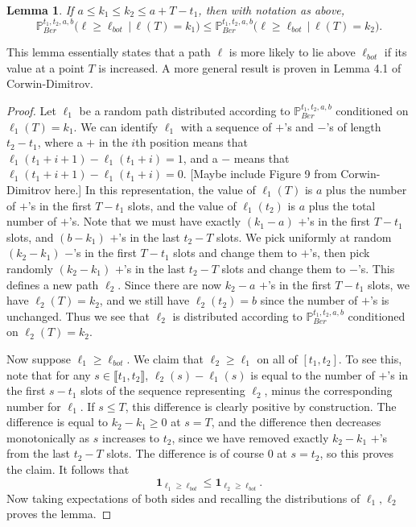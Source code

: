 \documentclass[12pt]{article}
\newtheorem{lemma}{Lemma}
\begin{document}
	\begin{lemma}\label{pathcounting}
		If $a\leq k_1\leq k_2\leq a + T - t_1$, then with notation as above,
		\[
		\mathbb{P}^{t_1, t_2, a, b}_{Ber}\big( \ell \geq \ell_{bot}\,\big|\,\ell(T) = k_1\big) \leq \mathbb{P}^{t_1, t_2, a, b}_{Ber}\big(\ell \geq \ell_{bot}\,\big|\,\ell(T) = k_2\big).
		\]
	\end{lemma}

	\begin{remark}
		This lemma essentially states that a path $\ell$ is more likely to lie above $\ell_{bot}$ if its value at a point $T$ is increased. A more general result is proven in Lemma 4.1 of Corwin-Dimitrov.
	\end{remark}

	\begin{proof}
		Let $\ell_1$ be a random path distributed according to $\mathbb{P}^{t_1, t_2, a, b}_{Ber}$ conditioned on $\ell_1(T) = k_1$. We can identify $\ell_1$ with a sequence of $+$'s and $-$'s of length $t_2-t_1$, where a $+$ in the $i$th position means that $\ell_1(t_1+i+1)-\ell_1(t_1+i) = 1$, and a $-$ means that $\ell_1(t_1+i+1)-\ell_1(t_1+i) = 0$. [Maybe include Figure 9 from Corwin-Dimitrov here.] In this representation, the value of $\ell_1(T)$ is $a$ plus the number of $+$'s in the first $T-t_1$ slots, and the value of $\ell_1(t_2)$ is $a$ plus the total number of $+$'s. Note that we must have exactly $(k_1-a)$ $+$'s in the first $T-t_1$ slots, and $(b-k_1)$ $+$'s in the last $t_2-T$ slots. We pick uniformly at random $(k_2-k_1)$ $-$'s in the first $T-t_1$ slots and change them to $+$'s, then pick randomly $(k_2-k_1)$ $+$'s in the last $t_2-T$ slots and change them to $-$'s. This defines a new path $\ell_2$. Since there are now $k_2-a$ $+$'s in the first $T-t_1$ slots, we have $\ell_2(T) = k_2$, and we still have $\ell_2(t_2) = b$ since the number of $+$'s is unchanged. Thus we see that $\ell_2$ is distributed according to $\mathbb{P}^{t_1,t_2,a,b}_{Ber}$ conditioned on $\ell_2(T) = k_2$. 
		
		Now suppose $\ell_1 \geq \ell_{bot}$. We claim that $\ell_2 \geq \ell_1$ on all of $[t_1,t_2]$. To see this, note that for any $s\in\llbracket t_1, t_2\rrbracket$, $\ell_2(s) - \ell_1(s)$ is equal to the number of $+$'s in the first $s-t_1$ slots of the sequence representing $\ell_2$, minus the corresponding number for $\ell_1$. If $s\leq T$, this difference is clearly positive by construction. The difference is equal to $k_2 - k_1 \geq 0$ at $s = T$, and the difference then decreases monotonically as $s$ increases to $t_2$, since we have removed exactly $k_2-k_1$ $+$'s from the last $t_2-T$ slots. The difference is of course 0 at $s = t_2$, so this proves the claim. It follows that
		\[
		\mathbf{1}_{\ell_1 \geq \ell_{bot}} \leq \mathbf{1}_{\ell_2 \geq \ell_{bot}}.
		\]
		Now taking expectations of both sides and recalling the distributions of $\ell_1,\ell_2$ proves the lemma.
	\end{proof}
\end{document}
